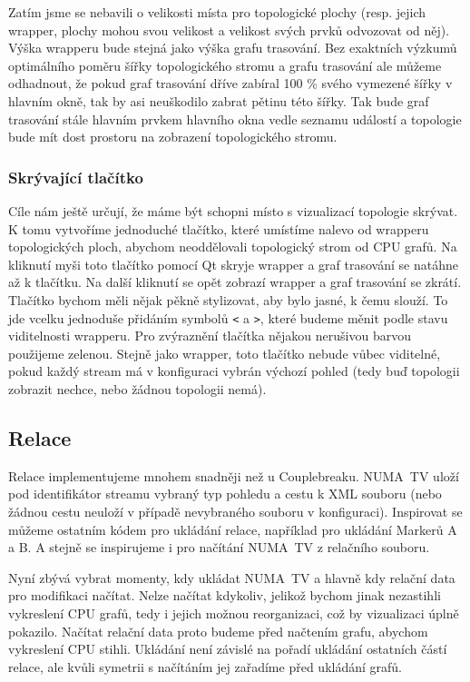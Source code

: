 Zatím jsme se nebavili o velikosti místa pro topologické plochy (resp. jejich wrapper, plochy mohou svou velikost a velikost svých prvků odvozovat od něj). Výška wrapperu bude stejná jako výška grafu trasování. Bez exaktních výzkumů optimálního poměru šířky topologického stromu a grafu trasování ale můžeme odhadnout, že pokud graf trasování dříve zabíral 100 \% svého vymezené šířky v hlavním okně, tak by asi neuškodilo zabrat pětinu této šířky. Tak bude graf trasování stále hlavním prvkem hlavního okna vedle seznamu událostí a topologie bude mít dost prostoru na zobrazení topologického stromu.

\subsubsection{Skrývající tlačítko}
Cíle nám ještě určují, že máme být schopni místo s vizualizací topologie skrývat. K tomu vytvoříme jednoduché tlačítko, které umístíme nalevo od wrapperu topologických ploch, abychom neoddělovali topologický strom od CPU grafů. Na kliknutí myši toto tlačítko pomocí Qt skryje wrapper a graf trasování se natáhne až k tlačítku. Na další kliknutí se opět zobrazí wrapper a graf trasování se zkrátí. Tlačítko bychom měli nějak pěkně stylizovat, aby bylo jasné, k čemu slouží. To jde vcelku jednoduše přidáním symbolů \texttt{<} a \texttt{>}, které budeme měnit podle stavu viditelnosti wrapperu. Pro zvýraznění tlačítka nějakou nerušivou barvou použijeme zelenou. Stejně jako wrapper, toto tlačítko nebude vůbec viditelné, pokud každý stream má v konfiguraci vybrán výchozí pohled (tedy buď topologii zobrazit nechce, nebo žádnou topologii nemá).

\subsection{Relace}
Relace implementujeme mnohem snadněji než u Couplebreaku. NUMA~TV uloží pod identifikátor streamu vybraný typ pohledu a cestu k XML souboru (nebo žádnou cestu neuloží v případě nevybraného souboru v konfiguraci). Inspirovat se můžeme ostatním kódem pro ukládání relace, například pro ukládání Markerů A a B. A stejně se inspirujeme i pro načítání NUMA~TV z relačního souboru.

Nyní zbývá vybrat momenty, kdy ukládat NUMA~TV a hlavně kdy relační data pro modifikaci načítat. Nelze načítat kdykoliv, jelikož bychom jinak nezastihli vykreslení CPU grafů, tedy i jejich možnou reorganizaci, což by vizualizaci úplně pokazilo. Načítat relační data proto budeme před načtením grafu, abychom vykreslení CPU stihli. Ukládání není závislé na pořadí ukládání ostatních částí relace, ale kvůli symetrii s načítáním jej zařadíme před ukládání grafů.


